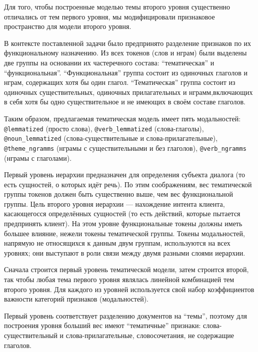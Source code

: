 Для того, чтобы построенные моделью темы второго уровня существенно отличались от тем первого уровня, мы модифицировали признаковое пространство для модели второго уровня.

В контексте поставленной задачи было предпринято разделение признаков по их функциональному назначению. Из всех токенов (слов и нграм) были выделены две группы на основании их частеречного состава: ``тематическая'' и ``функциональная''. ``Функциональная'' группа состоит из одиночных глаголов и нграм, содержащих хотя бы один глагол. ``Тематическая'' группа состоит из одиночных существительных, одиночных прилагательных и нграмм,включающих в себя хотя бы одно существительное и не имеющих в своём составе глаголов.

Таким образом, предлагаемая тематическая модель имеет пять модальностей: \texttt{@lemmatized} (просто слова), \texttt{@verb\_lemmatized} (слова-глаголы), \texttt{@noun\_lemmatized} (слова-существительные и слова-прилагательные), \texttt{@theme\_ngramms} (нграмы с существительными и без глаголов), \texttt{@verb\_ngramms} (нграмы с глаголами).


\par Первый уровень иерархии предназначен для определения субъекта диалога (то есть сущностей, о которых идёт речь). По этим соображениям, вес тематической группы токенов должен быть существенно выше, чем вес функциональной группы. Цель второго уровня иерархии --- нахождение интента клиента, касающегосся определённых сущностей (то есть действий, которые пытается предпринять клиент). На этом уровне функциональные токены должны иметь большее влияние, нежели токены тематической группы. Токены модальностей, напрямую не относящихся к данным двум группам, используются на всех уровнях; они выступают в роли связи между двумя разными слоями иерархии.



Сначала строится первый уровень тематической модели, затем строится второй, так чтобы любая тема первого уровня являлась линейной комбинацией тем второго уровня. Для каждого из уровней используется свой набор коэффициентов важности категорий признаков (модальностей). 

Первый уровень соответствует разделению документов на “темы”, поэтому для построения уровня больший вес имеют “тематичные” признаки: слова-существительный и слова-прилагательные, словосочетания, не содержащие глаголов. 

